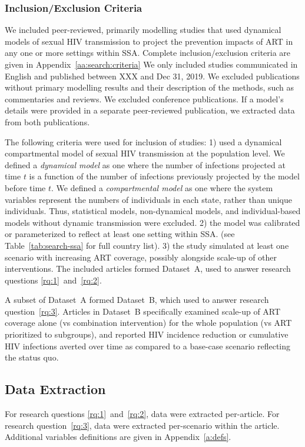 \subsubsection{Inclusion/Exclusion Criteria}
\label{sss:meth:criteria}
We included peer-reviewed, primarily modelling studies that used dynamical models of sexual HIV transmission
to project the prevention impacts of ART in any one or more settings within SSA.
Complete inclusion/exclusion criteria are given in 
Appendix~\ref{aa:search:criteria}
We only included studies communicated in English and published between XXX and Dec 31, 2019.
We excluded publications without primary modelling results and their description of the methods,
such as commentaries and reviews. We excluded conference publications.
If a model's details were provided in a separate peer-reviewed publication, we extracted data from both publications. %
\par
The following criteria were used for inclusion of studies:
1) used a dynamical compartmental model of
sexual HIV transmission at the population level.
We defined a \emph{dynamical model} as one where
the number of infections projected at time $t$ is a function of
the number of infections previously projected by the model before time $t$. %
We defined a \emph{compartmental model} as one where
the system variables represent the numbers of individuals in each state,
rather than unique individuals. %
Thus, statistical models, non-dynamical models, and individual-based models without dynamic transmission were excluded.
2) the model was calibrated or parameterized to reflect at least one setting within SSA.
(see Table~\ref{tab:search-ssa} for full country list).
3) the study simulated at least one scenario with increasing ART coverage,
possibly alongside scale-up of other interventions.
The included articles formed Dataset~A,
used to answer research questions \ref{rq:1}~and~\ref{rq:2}.
\par
A subset of Dataset~A formed Dataset~B,
which used to answer research question~\ref{rq:3}.
Articles in Dataset~B specifically examined
scale-up of ART coverage alone (vs combination intervention)
for the whole population (vs ART prioritized to subgroups),  %
and reported HIV incidence reduction or cumulative HIV infections averted over time 
as compared to a base-case scenario reflecting the status quo.
\subsection{Data Extraction}
\label{ss:meth:data}
For research questions \ref{rq:1}~and~\ref{rq:2}, data were extracted per-article.
For research question~\ref{rq:3}, data were extracted per-scenario within the article.
Additional variables definitions are given in Appendix~\ref{a:defs}.
